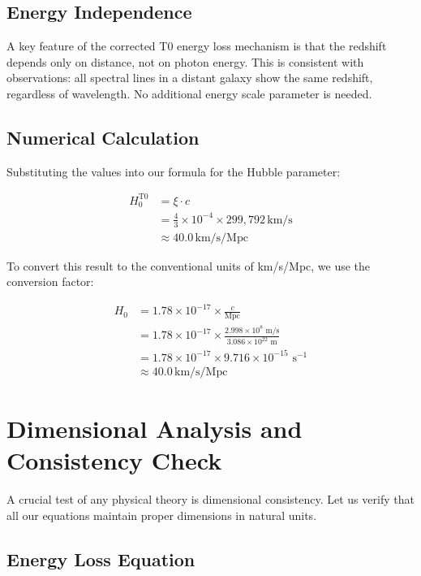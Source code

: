 \documentclass[12pt,a4paper]{report}
\begin{document}
	\subsection{Energy Independence}
	
	A key feature of the corrected T0 energy loss mechanism is that the redshift depends only on distance, not on photon energy. This is consistent with observations: all spectral lines in a distant galaxy show the same redshift, regardless of wavelength. No additional energy scale parameter is needed.

	\subsection{Numerical Calculation}
	
	Substituting the values into our formula for the Hubble parameter:
	
	\begin{align}
		H_0^{\text{T0}} &= \xi \cdot c \\
		&= \frac{4}{3} \times 10^{-4} \times 299{,}792\,\text{km/s} \\
		&\approx 40.0\,\text{km/s/Mpc}
	\end{align}
	
	To convert this result to the conventional units of km/s/Mpc, we use the conversion factor:
	
	\begin{align}
		H_0 &= 1.78 \times 10^{-17} \times \frac{c}{\text{Mpc}} \\
		&= 1.78 \times 10^{-17} \times \frac{2.998 \times 10^8 \text{ m/s}}{3.086 \times 10^{22} \text{ m}} \\
		&= 1.78 \times 10^{-17} \times 9.716 \times 10^{-15} \text{ s}^{-1} \\
		&\approx 40.0\,\text{km/s/Mpc}
	\end{align}
	
	\section{Dimensional Analysis and Consistency Check}
	
	A crucial test of any physical theory is dimensional consistency. Let us verify that all our equations maintain proper dimensions in natural units.
	
	\subsection{Energy Loss Equation}
	
\end{document}
